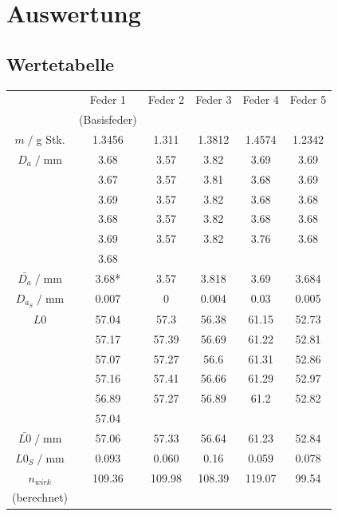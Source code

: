 \newpage
\section{Auswertung}
\subsection{Wertetabelle}
\begin{table}[H]
    \centering
    \begin{tabular}{c | c c c c c}
        \toprule
        & Feder 1 & Feder 2 & Feder 3 & Feder 4 & Feder 5 \\ & (Basisfeder)\\
        \midrule
        $m\;/\;$g Stk. & 1.3456 & 1.311 & 1.3812 & 1.4574 & 1.2342 \\
        \midrule
        $D_a\;/\;$mm & 3.68 & 3.57 & 3.82 & 3.69 & 3.69 \\
          & 3.67 & 3.57 & 3.81 & 3.68 & 3.69 \\
          & 3.69 & 3.57 & 3.82 & 3.68 & 3.68 \\
          & 3.68 & 3.57 & 3.82 & 3.68 & 3.68 \\
          & 3.69 & 3.57 & 3.82 & 3.76 & 3.68 \\
          & 3.68 &         &         &         &         \\
        \midrule
        $\bar{D_a}\;/\;$mm & 3.68* & 3.57 & 3.818 & 3.69 & 3.684\\
        $D_{a_S}\;/\;$mm& 0.007 & 0 & 0.004 & 0.03 & 0.005\\
        \midrule
        $L0$ 	& 57.04 	& 57.3 		& 56.38 	& 61.15 	& 52.73 	\\
                & 57.17 	& 57.39 	& 56.69 	& 61.22 	& 52.81 	\\
                & 57.07 	& 57.27 	& 56.6 		& 61.31 	& 52.86 	\\
                & 57.16 	& 57.41 	& 56.66 	& 61.29 	& 52.97 	\\
                & 56.89 	& 57.27 	& 56.89 	& 61.2 		& 52.82 	\\
                & 57.04 	&         	&         	&         	&   \\
        \midrule
        $\bar{L0}\;/\;$mm & 57.06 	& 57.33 	& 56.64 	& 61.23 	& 52.84	\\
        $L0{_S}\;/\;$mm & 0.093 	& 0.060 	& 0.16 	& 0.059 	& 0.078	\\
        $n_{wirk}$ & 109.36 & 109.98 & 108.39 & 119.07 & 99.54 \\(berechnet)\\

\end{tabular}
\end{table}
